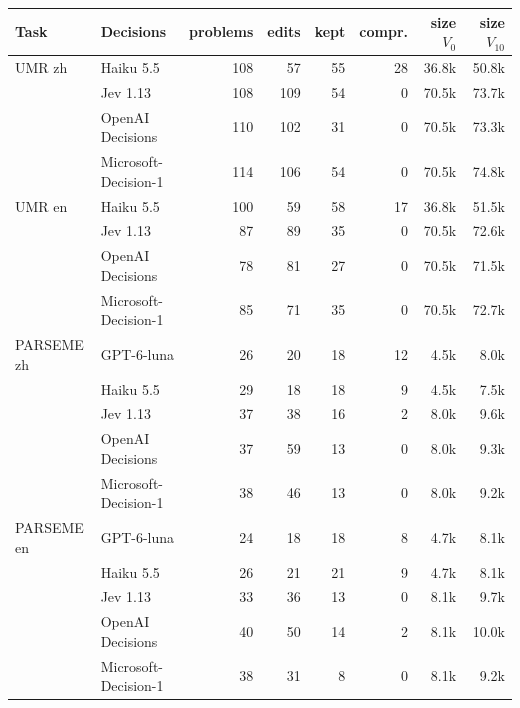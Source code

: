 \begin{tabular}{@{}llrrrrrr@{}}
\toprule
Task & Decisions & problems & edits & kept & compr. & size $V_0$ & size $V_{10}$ \\
\midrule
UMR zh & Haiku 5.5 & 108 & 57 & 55 & 28 & 36.8k & 50.8k \\
 & Jev 1.13 & 108 & 109 & 54 & 0 & 70.5k & 73.7k \\
 & OpenAI Decisions & 110 & 102 & 31 & 0 & 70.5k & 73.3k \\
 & Microsoft-Decision-1 & 114 & 106 & 54 & 0 & 70.5k & 74.8k \\
UMR en & Haiku 5.5 & 100 & 59 & 58 & 17 & 36.8k & 51.5k \\
 & Jev 1.13 & 87 & 89 & 35 & 0 & 70.5k & 72.6k \\
 & OpenAI Decisions & 78 & 81 & 27 & 0 & 70.5k & 71.5k \\
 & Microsoft-Decision-1 & 85 & 71 & 35 & 0 & 70.5k & 72.7k \\
PARSEME zh & GPT-6-luna & 26 & 20 & 18 & 12 & 4.5k & 8.0k \\
 & Haiku 5.5 & 29 & 18 & 18 & 9 & 4.5k & 7.5k \\
 & Jev 1.13 & 37 & 38 & 16 & 2 & 8.0k & 9.6k \\
 & OpenAI Decisions & 37 & 59 & 13 & 0 & 8.0k & 9.3k \\
 & Microsoft-Decision-1 & 38 & 46 & 13 & 0 & 8.0k & 9.2k \\
PARSEME en & GPT-6-luna & 24 & 18 & 18 & 8 & 4.7k & 8.1k \\
 & Haiku 5.5 & 26 & 21 & 21 & 9 & 4.7k & 8.1k \\
 & Jev 1.13 & 33 & 36 & 13 & 0 & 8.1k & 9.7k \\
 & OpenAI Decisions & 40 & 50 & 14 & 2 & 8.1k & 10.0k \\
 & Microsoft-Decision-1 & 38 & 31 & 8 & 0 & 8.1k & 9.2k \\
\bottomrule
\end{tabular}
